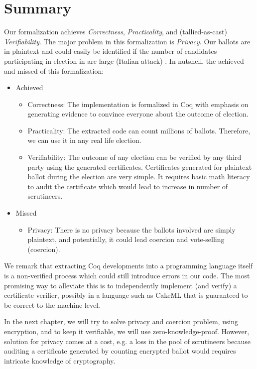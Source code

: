 \section{Summary}

Our formalization achieves \textit{Correctness}, \textit{Practicality}, and 
(tallied-as-cast) \textit{Verifiability}. The major problem in this formalization is \textit{Privacy}.  
Our ballots are in plaintext and could easily be identified
if the number of candidates participating in election in 
are large (Italian attack) \citep{Otten}.
\noindent
In nutshell, the achieved and missed of this formalization:

\begin{itemize}
\item Achieved 
\begin{itemize}
\item Correctness: The implementation is formalized in Coq with emphasis on generating 
         evidence to convince everyone about the outcome of election.
\item Practicality: The extracted code can count millions of ballots. Therefore, we can use it 
          in any real life election.
\item Verifiability: The outcome of any election can be verified by any third party using 
		  the generated certificates. Certificates generated for plaintext ballot 
		  during the election 
          are very simple.  It requires basic math literacy to audit the certificate which would 
          lead to increase in number of scrutineers. 

\end{itemize}
\item Missed
\begin{itemize}
\item Privacy: There is no privacy  because the ballots involved 
         are simply plaintext, and potentially, it could lead coercion and vote-selling (coercion).
\end{itemize}
\end{itemize}

We remark that extracting Coq developments into a
programming language itself is a non-verified process which could
still introduce errors in our code. The most promising way to
alleviate this is to independently implement (and verify) a
certificate verifier, possibly in a language such as CakeML
\citep{Kumar:2014:CVI} that is guaranteed to
be correct to the machine level. 

 In the next chapter, we will try to solve privacy and coercion problem, using encryption, and to keep 
 it verifiable, we will use zero-knowledge-proof. However, solution for privacy comes at a cost, e.g. 
 a loss in the pool of scrutineers because auditing a certificate generated by counting encrypted ballot 
 would requires intricate knowledge of cryptography.
 

